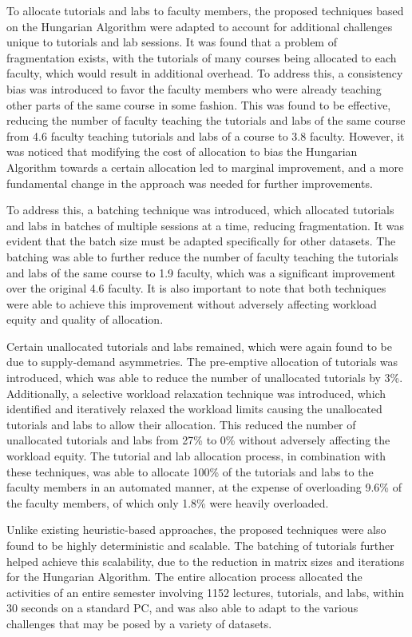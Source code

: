 To allocate tutorials and labs to faculty members, the proposed techniques based on the Hungarian Algorithm were adapted to account for additional challenges unique to tutorials and lab sessions. It was found that a problem of fragmentation exists, with the tutorials of many courses being allocated to each faculty, which would result in additional overhead. To address this, a consistency bias was introduced to favor the faculty members who were already teaching other parts of the same course in some fashion. This was found to be effective, reducing the number of faculty teaching the tutorials and labs of the same course from 4.6 faculty teaching tutorials and labs of a course to 3.8 faculty. However, it was noticed that modifying the cost of allocation to bias the Hungarian Algorithm towards a certain allocation led to marginal improvement, and a more fundamental change in the approach was needed for further improvements.

To address this, a batching technique was introduced, which allocated tutorials and labs in batches of multiple sessions at a time, reducing fragmentation. It was evident that the batch size must be adapted specifically for other datasets. The batching was able to further reduce the number of faculty teaching the tutorials and labs of the same course to 1.9 faculty, which was a significant improvement over the original 4.6 faculty. It is also important to note that both techniques were able to achieve this improvement without adversely affecting workload equity and quality of allocation.

Certain unallocated tutorials and labs remained, which were again found to be due to supply-demand asymmetries. The pre-emptive allocation of tutorials was introduced, which was able to reduce the number of unallocated tutorials by 3\%. Additionally, a selective workload relaxation technique was introduced, which identified and iteratively relaxed the workload limits causing the unallocated tutorials and labs to allow their allocation. This reduced the number of unallocated tutorials and labs from 27\% to 0\% without adversely affecting the workload equity. The tutorial and lab allocation process, in combination with these techniques, was able to allocate 100\% of the tutorials and labs to the faculty members in an automated manner, at the expense of overloading 9.6\% of the faculty members, of which only 1.8\% were heavily overloaded.

Unlike existing heuristic-based approaches, the proposed techniques were also found to be highly deterministic and scalable. The batching of tutorials further helped achieve this scalability, due to the reduction in matrix sizes and iterations for the Hungarian Algorithm. The entire allocation process allocated the activities of an entire semester involving 1152 lectures, tutorials, and labs, within 30 seconds on a standard PC, and was also able to adapt to the various challenges that may be posed by a variety of datasets.

